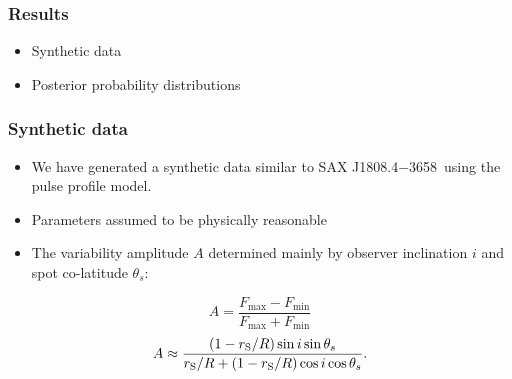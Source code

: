 \documentclass{beamer}
\def\rg{r_{\rm S}} %
\def\be{\begin{equation}}
\def\ee{\end{equation}}
\def\rg{r_{\rm S}} %
\def\source{SAX J1808.4$-$3658}
\def\thetas{\theta_{s}}
\begin{document}

\begin{frame}
\frametitle{Results}
\begin{itemize}
\item Synthetic data
\item Posterior probability distributions
\end{itemize}
\end{frame}


\begin{frame}
\frametitle{Synthetic data}

\begin{itemize}
\item We have generated a synthetic data similar to \source \ using the pulse profile model.
\item Parameters assumed to be physically reasonable
\item The variability amplitude $A$ determined mainly by observer inclination $i$ and spot co-latitude $\thetas$:
\end{itemize}
\be \label{eq:amplitude}
A = \frac{F_{\mathrm{max}} - F_{\mathrm{min}}} {F_{\mathrm{max}} + F_{\mathrm{min}}}
\ee %
\be \label{eq:amplitude_incthet}
A \approx \frac{(1-\rg/R)\sin i \sin \thetas}{\rg/R+(1-\rg/R)\cos i \cos \thetas}.
\ee 



\end{frame}
\end{document}
